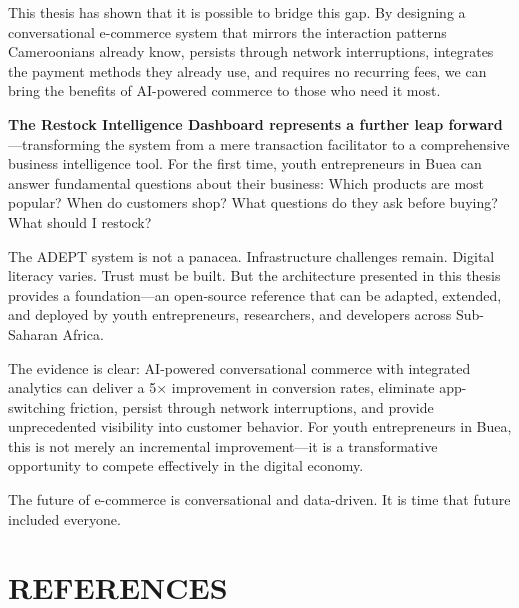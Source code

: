 \documentclass[12pt,a4paper]{article}
\begin{document}
This thesis has shown that it is possible to bridge this gap. By designing a conversational e-commerce system that mirrors the interaction patterns Cameroonians already know, persists through network interruptions, integrates the payment methods they already use, and requires no recurring fees, we can bring the benefits of AI-powered commerce to those who need it most.

\textbf{The Restock Intelligence Dashboard represents a further leap forward}---transforming the system from a mere transaction facilitator to a comprehensive business intelligence tool. For the first time, youth entrepreneurs in Buea can answer fundamental questions about their business: Which products are most popular? When do customers shop? What questions do they ask before buying? What should I restock?

The ADEPT system is not a panacea. Infrastructure challenges remain. Digital literacy varies. Trust must be built. But the architecture presented in this thesis provides a foundation---an open-source reference that can be adapted, extended, and deployed by youth entrepreneurs, researchers, and developers across Sub-Saharan Africa.

The evidence is clear: AI-powered conversational commerce with integrated analytics can deliver a 5× improvement in conversion rates, eliminate app-switching friction, persist through network interruptions, and provide unprecedented visibility into customer behavior. For youth entrepreneurs in Buea, this is not merely an incremental improvement---it is a transformative opportunity to compete effectively in the digital economy.

The future of e-commerce is conversational and data-driven. It is time that future included everyone.

\newpage

\section*{REFERENCES}
\end{document}
